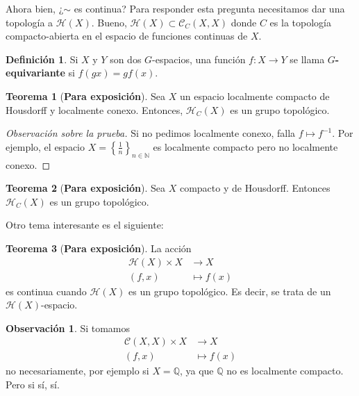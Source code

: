 \documentclass[spanish]{article}
\theoremstyle{definition}
\newtheorem*{defn}{Definición}
\newtheorem*{obs}{Observación}
\newtheorem*{teo}{Teorema}
\newcommand{\N}{\mathbb{N}}
\newcommand{\Q}{\mathbb{Q}}
\newcommand{\Hom}{\mathcal{H}}
\newcommand{\Cnt}{\mathcal{C}}
\begin{document}
Ahora bien, ¿$\sim$ es continua? Para responder esta pregunta necesitamos dar una topología a $\Hom(X)$. Bueno, $\Hom(X)\subset\Cnt_C(X,X)$ donde $C$ es la topología compacto-abierta en el espacio de funciones continuas de $X$.
\begin{defn}
	Si $X$ y $Y$ son dos $G$-espacios, una función $f:X\to Y$ se llama $G$\textbf{-equivariante} si $f(gx)=gf(x)$.
\end{defn}
\begin{teo}[\textbf{Para exposición}]
	Sea $X$ un espacio localmente compacto de Housdorff y localmente conexo. Entonces, $\Hom_C(X)$ es un grupo topológico.
\end{teo}
\begin{proof}[Observación sobre la prueba]
	Si no pedimos localmente conexo, falla $f\mapsto f^{-1}$. Por ejemplo, el espacio $X=\left\{\frac{1}{n}\right\}_{n\in\N}$ es localmente compacto pero no localmente conexo.
\end{proof}
\begin{teo}[\textbf{Para exposición}]
	Sea $X$ compacto y de Housdorff. Entonces $\Hom_C(X)$ es un grupo topológico.
\end{teo}
Otro tema interesante es el siguiente:
\begin{teo}[\textbf{Para exposición}]
	La acción
	\begin{align*}
	\Hom(X)\times X&\to X\\
	(f,x)&\mapsto f(x)
\end{align*}
es continua cuando $\Hom(X)$ es un grupo topológico. Es decir, se trata de un $\Hom(X)$-espacio.
\end{teo}
\begin{obs}
	Si tomamos
\begin{align*}
	\Cnt(X,X)\times X&\to X\\
	(f,x)&\mapsto f(x)
\end{align*}
no necesariamente, por ejemplo si $X=\Q$, ya que $\Q$ no es localmente compacto. Pero si sí, sí.
\end{obs}
\end{document}
